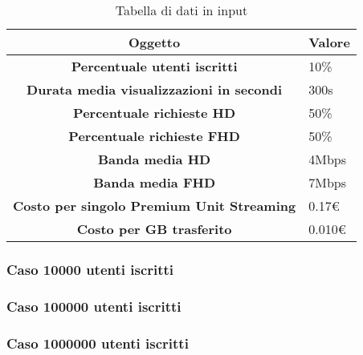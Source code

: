 \begin{table}[!h]
    \label{tab:ripartizione-ore}
    \begin{tabularx}{\textwidth}{|c|X|}
        \hline
        \textbf{Oggetto} & \textbf{Valore} \\\hline
        
        \textbf{Percentuale utenti iscritti} & {10\%} \\ 
        \hline
        \textbf{Durata media visualizzazioni in secondi} & {300s} \\ 
        \hline
        \textbf{Percentuale richieste HD} & {50\%}\\
        \hline
        \textbf{Percentuale richieste FHD} & {50\%}\\  
        \hline
        \textbf{Banda media HD} & {4Mbps}\\  
        \hline
        \textbf{Banda media FHD} & {7Mbps}\\  
        \hline
        \textbf{Costo per singolo Premium Unit Streaming} & {0.17€}\\  
        \hline
        \textbf{Costo per GB trasferito} & {0.010€}\\  
        \hline
    \end{tabularx}
    \caption{Tabella di dati in input}

\end{table}

\subsubsection{Caso 10000 utenti iscritti}
\subsubsection{Caso 100000 utenti iscritti}
\subsubsection{Caso 1000000 utenti iscritti}